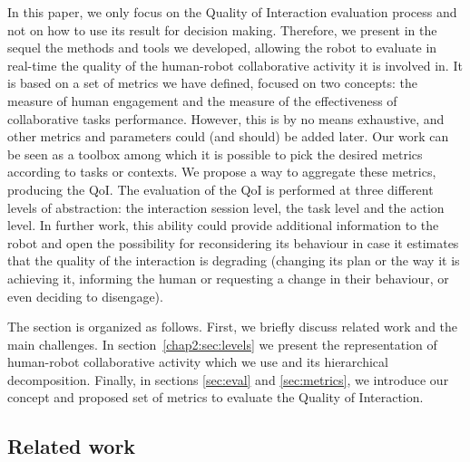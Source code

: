 \documentclass[a4paper,11pt,twoside]{StyleThese}
\begin{document}
In this paper, we only focus on the Quality of Interaction evaluation process and not on how to use its result for decision making. Therefore,  we present in the sequel the methods and tools we developed, allowing the robot to evaluate in real-time the quality of the human-robot collaborative activity it is involved in. It is based on a set of metrics we have defined, focused on two concepts: the measure of human engagement and the measure of the effectiveness of collaborative tasks performance. However, this is by no means exhaustive, and other metrics and parameters could (and should) be added later. Our work can be seen as a toolbox among which it is possible to pick the desired metrics according to tasks or contexts. We propose a way to aggregate these metrics, producing the QoI. The evaluation of the QoI is performed at three different levels of abstraction: the interaction session level, the task level and the action level. In further work, this ability could provide additional information to the robot and open the possibility for reconsidering its behaviour in case it estimates that the quality of the interaction is degrading (\eg changing its plan or the way it is achieving it, informing the human or requesting a change in their behaviour, or even deciding to disengage).

The section is organized as follows. First, we briefly discuss related work and the main challenges. In section~\ref{chap2:sec:levels} we present the representation of human-robot collaborative activity which we use and its hierarchical  decomposition. Finally, in sections \ref{sec:eval} and \ref{sec:metrics}, we introduce our concept and proposed set of metrics to evaluate the Quality of Interaction.

\subsection{Related work}\label{sec:rel}
\end{document}

